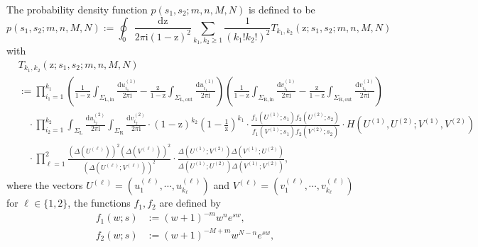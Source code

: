 \documentclass{article}
\numberwithin{equation}{section}
\newcommand{\ddbar}[2]{\frac{{\mathrm d}#1}{2\pi {\mathrm i}#2}}
\newcommand{\inn}{\mathrm{in}}
\newcommand{\LL}{\mathrm{L}}
\newcommand{\out}{\mathrm{out}}
\newcommand{\RR}{\mathrm{R}}
\begin{document}
The probability density function $p(s_1,s_2;m,n,M,N)$ is defined to be
\begin{equation}
	\label{eq:def_finite_time_density}
	p(s_1,s_2;m,n,M,N)
	:=\oint_0\ddbar{\mathrm{z}}{\mathrm{(1-z)^2}}\sum_{k_1,k_2\ge 1}
	     \frac{1}{(k_1!k_2!)^2}
	     T_{k_1,k_2}(\mathrm{z};s_1,s_2;m,n,M,N)
\end{equation}
with
\begin{equation}
	\label{eq:def_T}
	\begin{split}
		&T_{k_1,k_2}(\mathrm{z};s_1,s_2;m,n,M,N)\\
		&:=
		    \prod_{i_1=1}^{k_1}     
		        \left(  \frac{1}{1-\mathrm{z}} \int_{\Sigma_{\LL,\inn}} 	    
		               \ddbar{u^{(1)}_{i_1}}{}   
		               -\frac{\mathrm{z}}{1-\mathrm{z}} \int_{\Sigma_{\LL,\out}} \ddbar{u^{(1)}_{i_1}}{}
		        \right)
		        \left(  \frac{1}{1-\mathrm{z}}  \int_{\Sigma_{\RR,\inn}}  
		               \ddbar{v^{(1)}_{i_1}}{}
		              -\frac{\mathrm{z}}{1-\mathrm{z}}   \int_{\Sigma_{\RR,\out}}
		               \ddbar{v^{(1)}_{i_1}}{}
		        \right)
		\\
		&\quad \cdot 
		         \prod_{i_2=1}^{k_2}  
		            \int_{\Sigma_\LL} \ddbar{u^{(2)}_{i_2}}{} 
		            \int_{\Sigma_\RR} \ddbar{v^{(2)}_{i_2}}{} 
		       \cdot    
		           \left(1-\mathrm{z}\right)^{k_2}
		           \left(1-\frac{1}{\mathrm{z}}\right)^{k_1}
		       \cdot 
		           \frac{f_1(U^{(1)};s_1)f_2(U^{(2)};s_2)}{f_1(V^{(1)};s_1)f_2(V^{(2)};s_2)}
		       \cdot
		            H(U^{(1)},U^{(2)};V^{(1)},V^{(2)})\\
		&\quad \cdot 
		           \prod_{\ell=1}^2
		           \frac{\left( \Delta(U^{(\ell)}) \right)^2
		           	     \left( \Delta(V^{(\ell)}) \right)^2
	           	         }
		                {\left( \Delta(U^{(\ell)}; V^{(\ell)}) \right)^2}
		       \cdot 
		           \frac{\Delta(U^{(1)};V^{(2)})\Delta(V^{(1)};U^{(2)})}
		                {\Delta(U^{(1)};U^{(2)})\Delta(V^{(1)};V^{(2)})},
	\end{split}
\end{equation}
where the vectors $U^{(\ell)}=(u_1^{(\ell)},\cdots,u_{k_\ell}^{(\ell)})$ and $V^{(\ell)}=(v_1^{(\ell)},\cdots,v^{(\ell)}_{k_\ell})$ for $\ell\in\{1,2\}$, the functions $f_1,f_2$ are defined by
\begin{equation}
	\label{eq:def_f}
	\begin{split}
	f_1(w;s)&:=(w+1)^{-m} w^n e^{s w},\\
	f_2(w;s)&:= (w+1)^{-M+m} w^{N-n} e^{s w},
	\end{split}
\end{equation}
\end{document}
